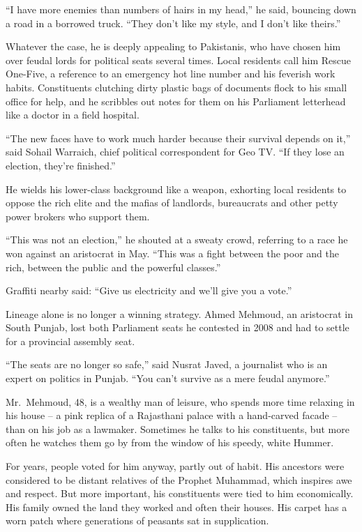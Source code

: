 ﻿\documentclass[12pt]{article}
\begin{document}
``I have more enemies than numbers of hairs in my head,'' he said, bouncing down a road in a
borrowed truck. ``They don't like my style, and I don't like theirs.''

Whatever the case, he is deeply appealing to Pakistanis, who have chosen him over feudal lords for
political seats several times. Local residents call him Rescue One-Five, a reference to an emergency
hot line number and his feverish work habits. Constituents clutching dirty plastic bags of documents
flock to his small office for help, and he scribbles out notes for them on his Parliament letterhead
like a doctor in a field hospital.

``The new faces have to work much harder because their survival depends on it,'' said Sohail
Warraich, chief political correspondent for Geo TV. ``If they lose an election, they're finished.''

He wields his lower-class background like a weapon, exhorting local residents to oppose the rich
elite and the mafias of landlords, bureaucrats and other petty power brokers who support them.

``This was not an election,'' he shouted at a sweaty crowd, referring to a race he won against an
aristocrat in May. ``This was a fight between the poor and the rich, between the public and the
powerful classes.''

Graffiti nearby said: ``Give us electricity and we'll give you a vote.''

Lineage alone is no longer a winning strategy. Ahmed Mehmoud, an aristocrat in South Punjab, lost
both Parliament seats he contested in 2008 and had to settle for a provincial assembly seat.

``The seats are no longer so safe,'' said Nusrat Javed, a journalist who is an expert on politics in
Punjab. ``You can't survive as a mere feudal anymore.''

Mr.~Mehmoud, 48, is a wealthy man of leisure, who spends more time relaxing in his house -- a pink
replica of a Rajasthani palace with a hand-carved facade -- than on his job as a lawmaker. Sometimes
he talks to his constituents, but more often he watches them go by from the window of his speedy,
white Hummer.

For years, people voted for him anyway, partly out of habit. His ancestors were considered to be
distant relatives of the Prophet Muhammad, which inspires awe and respect. But more important, his
constituents were tied to him economically. His family owned the land they worked and often their
houses. His carpet has a worn patch where generations of peasants sat in supplication.
\end{document}

